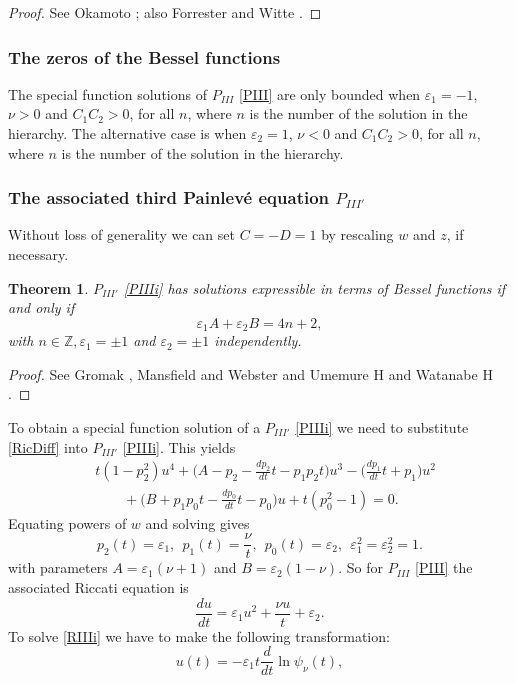\documentclass[12pt]{article}
\def\P{Painlev\'e }
\def\Z{\mathbb{Z}}
\newtheorem{mydef}{Theorem}[section]
\numberwithin{figure}{section}
\numberwithin{equation}{section}
\numberwithin{table}{section}
\begin{document}
\begin{proof}
See Okamoto \cite{P:275:221}; also Forrester and Witte \cite{P:219:357}.
\end{proof}
\subsubsection{The zeros of the Bessel functions}
The special function solutions of $P_{III}$ \eqref{PIII} are only bounded when $\varepsilon_1=-1$, $\nu>0$ and $C_1C_2>0$, for all $n$, where $n$ is the number of the solution in the hierarchy. The alternative case is when $\varepsilon_2=1$, $\nu<0$ and $C_1C_2>0$, for all $n$, where $n$ is the number of the solution in the hierarchy.
\subsubsection{The associated third \P equation  $P_{III'}$}
Without loss of generality we can set $C=-D=1$  by rescaling $w$ and $z$, if necessary.
\begin{mydef}
$P_{III'}$ \eqref{PIIIi} has solutions expressible in terms of Bessel functions if and only if
$$\varepsilon_1A+\varepsilon_2B=4n+2,$$
with $n\in\Z, \varepsilon_1=\pm1$ and $\varepsilon_2=\pm1$ independently.
\end{mydef}
\begin{proof}
See Gromak \cite{P:14:1510}, Mansfield and Webster \cite{P:101:321} and Umemure H and Watanabe H \cite{P:151:1}.
\end{proof}
To obtain a special function solution of a $P_{III'}$ \eqref{PIIIi} we need to substitute \eqref{RicDiff} into $P_{III'}$ \eqref{PIIIi}. This yields
\begin{align*}
&t(1-p_2^2)u^4+\bigg(A-p_2-\frac{dp_2}{dt}t-p_1p_2t\bigg)u^3-\bigg(\frac{dp_1}{dt}t+p_1\bigg)u^2\\
&\qquad+\bigg(B+p_1p_0t-\frac{dp_0}{dt}t-p_0\bigg)u+t(p_0^2-1)=0.
\end{align*}
Equating powers of $w$ and solving gives
$$p_2(t)=\varepsilon_1,~~p_1(t)=\frac{\nu}{t},~~p_0(t)=\varepsilon_2,~~\varepsilon_1^2=\varepsilon_2^2=1.$$
with parameters $A=\varepsilon_1(\nu+1)$ and $B=\varepsilon_2(1-\nu)$.
So for $P_{III}$ \eqref{PIII} the associated Riccati equation is
\begin{equation}
\frac{du}{dt}=\varepsilon_1u^2+\frac{\nu u}{t}+\varepsilon_2.\label{RIIIi}
\end{equation}
To solve \eqref{RIIIi} we have to make the following transformation:
$$u(t)=-\varepsilon_1t\frac{d}{dt}\ln\psi_\nu(t),$$
\end{document}
